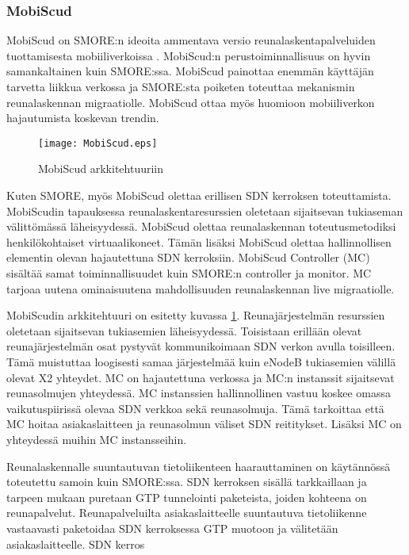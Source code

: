 \subsubsection{MobiScud} \label{mobiscud}
MobiScud on SMORE:n ideoita ammentava versio reunalaskentapalveluiden tuottamisesta mobiiliverkoissa \cite{wang2015mobiscud}.
MobiScud:n perustoiminnallisuus on hyvin samankaltainen kuin SMORE:ssa. MobiScud painottaa enemmän käyttäjän tarvetta liikkua verkossa ja SMORE:sta poiketen toteuttaa mekanismin reunalaskennan migraatiolle. 
MobiScud ottaa myös huomioon mobiiliverkon hajautumista koskevan trendin.

\begin{figure}[tb]
\texttt{[image: MobiScud.eps]}
\caption{MobiScud arkkitehtuuriin } \label{fig:mobiscud}
\end{figure}

Kuten SMORE, myös MobiScud olettaa erillisen SDN kerroksen toteuttamista. MobiScudin tapauksessa reunalaskentaresurssien oletetaan sijaitsevan tukiaseman välittömässä läheisyydessä. 
MobiScud olettaa reunalaskennan toteutusmetodiksi henkilökohtaiset virtuaalikoneet.
Tämän lisäksi MobiScud olettaa hallinnollisen elementin olevan hajautettuna SDN kerroksiin. MobiScud Controller (MC) sisältää samat toiminnallisuudet kuin SMORE:n controller ja monitor. 
MC tarjoaa uutena ominaisuutena mahdollisuuden reunalaskennan live migraatiolle.

MobiScudin arkkitehtuuri on esitetty kuvassa \ref{fig:mobiscud}.
Reunajärjestelmän resurssien oletetaan sijaitsevan tukiasemien läheisyydessä.
Toisistaan erillään olevat reunajärjestelmän osat pystyvät kommunikoimaan SDN verkon avulla toisilleen.
Tämä muistuttaa loogisesti samaa järjestelmää kuin eNodeB tukiasemien välillä olevat X2 yhteydet.
MC on hajautettuna verkossa ja MC:n instanssit sijaitsevat reunasolmujen yhteydessä.
MC instanssien hallinnollinen vastuu koskee omassa vaikutuspiirissä olevaa SDN verkkoa sekä reunasolmuja. Tämä tarkoittaa että MC hoitaa asiakaslaitteen ja reunasolmun väliset SDN reititykset. Lisäksi MC on yhteydessä muihin MC instansseihin.

Reunalaskennalle suuntautuvan tietoliikenteen haarauttaminen on käytännössä toteutettu samoin kuin SMORE:ssa.
SDN kerroksen sisällä tarkkaillaan ja tarpeen mukaan puretaan GTP tunnelointi paketeista, joiden kohteena on reunapalvelut. Reunapalveluilta asiakaslaitteelle suuntautuva tietoliikenne vastaavasti paketoidaa SDN kerroksessa GTP muotoon ja välitetään asiakaslaitteelle.
SDN kerros

